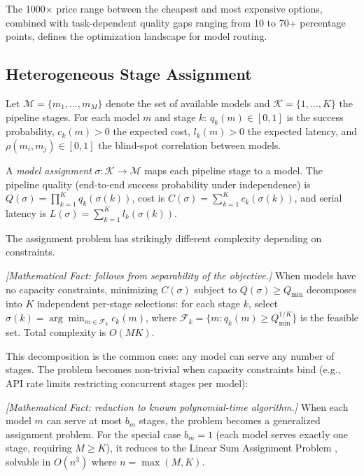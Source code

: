 The 1000$\times$ price range between the cheapest and most expensive options, combined with task-dependent quality gaps ranging from 10 to 70+ percentage points, defines the optimization landscape for model routing.

\subsection{Heterogeneous Stage Assignment}

Let $\mathcal{M} = \{m_1, \ldots, m_M\}$ denote the set of available models and $\mathcal{K} = \{1, \ldots, K\}$ the pipeline stages. For each model $m$ and stage $k$: $q_k(m) \in [0,1]$ is the success probability, $c_k(m) > 0$ the expected cost, $l_k(m) > 0$ the expected latency, and $\rho(m_i, m_j) \in [0,1]$ the blind-spot correlation between models.

\begin{definition}
\label{def:model-assignment}
A \emph{model assignment} $\sigma: \mathcal{K} \to \mathcal{M}$ maps each pipeline stage to a model. The pipeline quality (end-to-end success probability under independence) is $Q(\sigma) = \prod_{k=1}^{K} q_k(\sigma(k))$, cost is $C(\sigma) = \sum_{k=1}^{K} c_k(\sigma(k))$, and serial latency is $L(\sigma) = \sum_{k=1}^{K} l_k(\sigma(k))$.
\end{definition}

The assignment problem has strikingly different complexity depending on constraints.

\begin{proposition}
\emph{[Mathematical Fact: follows from separability of the objective.]}
\label{prop:routing-decompose}
When models have no capacity constraints, minimizing $C(\sigma)$ subject to $Q(\sigma) \geq Q_{\min}$ decomposes into $K$ independent per-stage selections: for each stage $k$, select $\sigma(k) = \arg\min_{m \in \mathcal{F}_k} c_k(m)$, where $\mathcal{F}_k = \{m : q_k(m) \geq Q_{\min}^{1/K}\}$ is the feasible set. Total complexity is $O(MK)$.
\end{proposition}

This decomposition is the common case: any model can serve any number of stages. The problem becomes non-trivial when capacity constraints bind (e.g., API rate limits restricting concurrent stages per model):

\begin{proposition}
\emph{[Mathematical Fact: reduction to known polynomial-time algorithm.]}
\label{prop:routing-hungarian}
When each model $m$ can serve at most $b_m$ stages, the problem becomes a generalized assignment problem. For the special case $b_m = 1$ (each model serves exactly one stage, requiring $M \geq K$), it reduces to the Linear Sum Assignment Problem \citep{kuhn1955, munkres1957}, solvable in $O(n^3)$ where $n = \max(M,K)$.
\end{proposition}

